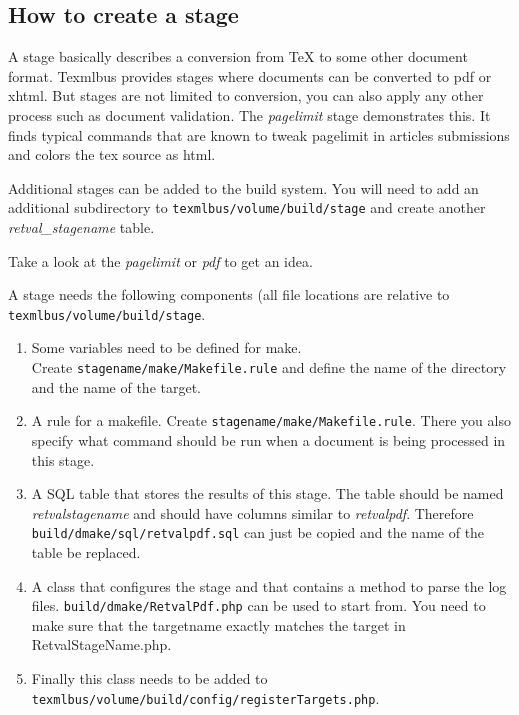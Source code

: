 \documentclass[a4paper]{article}
\begin{document}
\subsection{How to create a stage}

A stage basically describes a conversion from \TeX{} to some other document format. 
Texmlbus provides stages where documents can be converted to pdf or xhtml.  But stages are not limited to conversion, you can also apply any other process such as  document validation. The \textsl{pagelimit} stage demonstrates this. It finds typical commands that are known to tweak pagelimit in articles submissions and colors the tex source as html.

Additional stages can be added to the build system. You will need to add an additional subdirectory to \texttt{texmlbus/volume/build/stage} and create another \textsl{retval\_stagename} table.

Take a look at the \textsl{pagelimit} or \textsl{pdf} to get an idea.

A stage needs the following components (all file locations are relative to \texttt{texmlbus/volume/build/stage}.

\begin{enumerate}
\item Some variables need to be defined for make.\\
Create \texttt{stagename/make/Makefile.rule} and define the name of the directory and the name of the target.

\item A rule for a makefile. Create \texttt{stagename/make/Makefile.rule}. There you also specify what command should be run when a document is being processed in this stage.

\item A SQL table that stores the results of this stage. The table should be named \textsl{retval\textunderscore{}stagename} and should have columns similar to \textsl{retval\textunderscore{}pdf}.  Therefore \texttt{build/dmake/sql/retval\textunderscore{}pdf.sql} can just be copied and the name of the table be replaced.

\item A class that configures the stage and that contains a method to parse the log files.  \texttt{build/dmake/RetvalPdf.php} can be used to start from. You need to make sure that the targetname exactly matches the target in RetvalStageName.php.

\item Finally this class needs to be added to\\ 
\texttt{texmlbus/volume/build/config/registerTargets.php}.
\end{enumerate}
\end{document}
